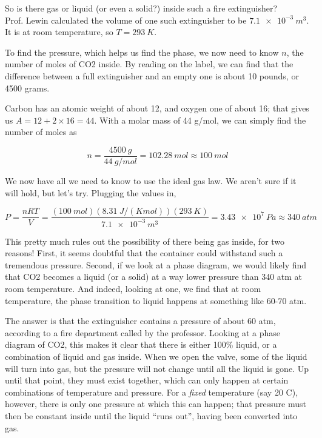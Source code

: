 \documentclass[8.01x]{subfiles}
\begin{document}
So is there gas or liquid (or even a solid?) inside such a fire extinguisher?\\
Prof. Lewin calculated the volume of one such extinguisher to be $\SI{7.1e-3}{m^3}$. It is at room temperature, so $T = \SI{293}{K}$.

To find the pressure, which helps us find the phase, we now need to know $n$, the number of moles of CO2 inside. By reading on the label, we can find that the difference between a full extinguisher and an empty one is about 10 pounds, or 4500 grams.

Carbon has an atomic weight of about 12, and oxygen one of about 16; that gives us $A = 12 + 2\times 16 = 44$. With a molar mass of 44 g/mol, we can simply find the number of moles as

\begin{equation}
n = \frac{\SI{4500}{g}}{\SI{44}{g/mol}} = \SI{102.28}{mol} \approx \SI{100}{mol}
\end{equation}

We now have all we need to know to use the ideal gas law. We aren't sure if it will hold, but let's try. Plugging the values in,

\begin{equation}
P = \frac{n R T}{V} = \frac{ (\SI{100}{mol})(\SI{8.31}{J/(K mol)})(\SI{293}{K})}{\SI{7.1e-3}{m^3}} = \SI{3.43e7}{Pa} \approx \SI{340}{atm}
\end{equation}

This pretty much rules out the possibility of there being gas inside, for two reasons! First, it seems doubtful that the container could withstand such a tremendous pressure. Second, if we look at a phase diagram, we would likely find that CO2 becomes a liquid (or a solid) at a way lower pressure than 340 atm at room temperature. And indeed, looking at one, we find that at room temperature, the phase transition to liquid happens at something like 60-70 atm.

The answer is that the extinguisher contains a pressure of about 60 atm, according to a fire department called by the professor. Looking at a phase diagram of CO2, this makes it clear that there is either 100\% liquid, or a combination of liquid and gas inside. When we open the valve, some of the liquid will turn into gas, but the pressure will not change until all the liquid is gone. Up until that point, they must exist together, which can only happen at certain combinations of temperature and pressure. For a \emph{fixed} temperature (say 20 C), however, there is only one pressure at which this can happen; that pressure must then be constant inside until the liquid ``runs out'', having been converted into gas.
\end{document}
